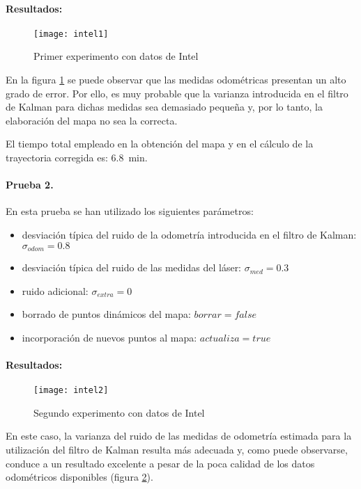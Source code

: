 \paragraph{Resultados:}

\begin{figure}[h]
  \centering\texttt{[image: intel1]}\\
  \caption{Primer experimento con datos de Intel}\label{fg:intel1}
\end{figure}

En la figura \ref{fg:intel1} se puede observar que las medidas odométricas presentan un alto grado de error. Por ello, es muy probable que la varianza introducida en el filtro de Kalman para dichas medidas sea demasiado pequeña y, por lo tanto, la elaboración del mapa no sea la correcta.

El tiempo total empleado en la obtención del mapa y en el cálculo de la trayectoria corregida es: 6.8~min.

\paragraph{Prueba 2.}
En esta prueba se han utilizado los siguientes parámetros:
\begin{itemize}
  \item desviación típica del ruido de la odometría introducida en el filtro de Kalman: $\sigma_{odom} = 0.8$
  \item desviación típica del ruido de las medidas del láser: $\sigma_{med} = 0.3$
  \item ruido adicional: $\sigma_{extra} = 0$
  \item borrado de puntos dinámicos del mapa: $borrar = false$
  \item incorporación de nuevos puntos al mapa: $actualiza = true$
\end{itemize}

\paragraph{Resultados:}

\begin{figure}[h]
  \centering\texttt{[image: intel2]}\\
  \caption{Segundo experimento con datos de Intel}\label{fg:intel2}
\end{figure}

En este caso, la varianza del ruido de las medidas de odometría estimada para la utilización del filtro de Kalman resulta más adecuada y, como puede observarse, conduce a un resultado excelente a pesar de la poca calidad de los datos odométricos disponibles (figura \ref{fg:intel2}).

